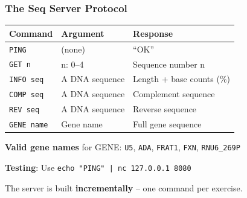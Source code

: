 \documentclass[xcolor=table]{beamer}
\begin{document}
\begin{frame}
\frametitle{The Seq Server Protocol}

\begingroup\small
\begin{center}
\begin{tabular}{|l|l|l|}
\hline
\textbf{Command} & \textbf{Argument} & \textbf{Response} \\
\hline
\texttt{PING} & (none) & ``OK'' \\
\hline
\texttt{GET n} & n: 0--4 & Sequence number n \\
\hline
\texttt{INFO seq} & A DNA sequence & Length + base counts (\%) \\
\hline
\texttt{COMP seq} & A DNA sequence & Complement sequence \\
\hline
\texttt{REV seq} & A DNA sequence & Reverse sequence \\
\hline
\texttt{GENE name} & Gene name & Full gene sequence \\
\hline
\end{tabular}
\end{center}
\endgroup

\vspace{0.2cm}

\textbf{Valid gene names} for GENE: \texttt{U5}, \texttt{ADA}, \texttt{FRAT1}, \texttt{FXN}, \texttt{RNU6\_269P}

\vspace{0.2cm}

\textbf{Testing}: Use \texttt{echo "PING" | nc 127.0.0.1 8080}

\vspace{0.2cm}

The server is built \textbf{incrementally} -- one command per exercise.

\end{frame}
\end{document}
